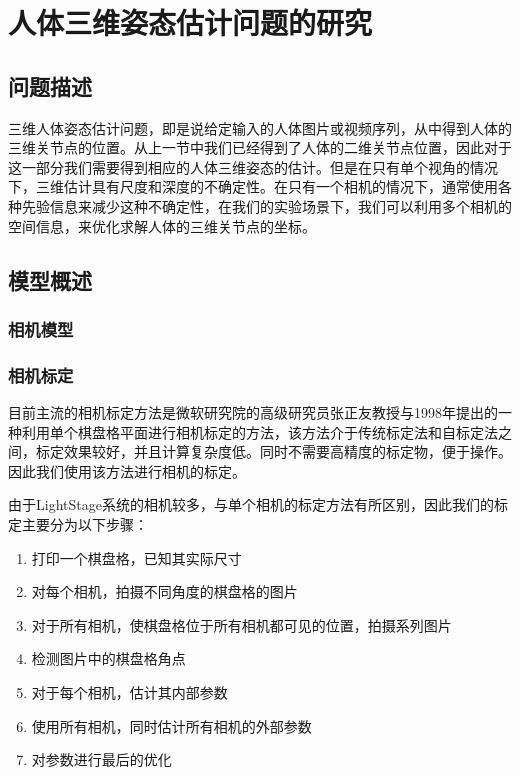 

\section{人体三维姿态估计问题的研究}
\subsection{问题描述}
三维人体姿态估计问题，即是说给定输入的人体图片或视频序列，从中得到人体的三维关节点的位置。从上一节中我们已经得到了人体的二维关节点位置，因此对于这一部分我们需要得到相应的人体三维姿态的估计。但是在只有单个视角的情况下，三维估计具有尺度和深度的不确定性。在只有一个相机的情况下，通常使用各种先验信息来减少这种不确定性，在我们的实验场景下，我们可以利用多个相机的空间信息，来优化求解人体的三维关节点的坐标。

\subsection{模型概述}
\subsubsection{相机模型}

\subsubsection{相机标定}
目前主流的相机标定方法是微软研究院的高级研究员张正友教授与1998年提出的一种利用单个棋盘格平面进行相机标定的方法，该方法介于传统标定法和自标定法之间，标定效果较好，并且计算复杂度低。同时不需要高精度的标定物，便于操作。因此我们使用该方法进行相机的标定。

由于LightStage系统的相机较多，与单个相机的标定方法有所区别，因此我们的标定主要分为以下步骤：
\begin{enumerate}
    \item 打印一个棋盘格，已知其实际尺寸
    \item 对每个相机，拍摄不同角度的棋盘格的图片
    \item 对于所有相机，使棋盘格位于所有相机都可见的位置，拍摄系列图片
    \item 检测图片中的棋盘格角点
    \item 对于每个相机，估计其内部参数
    \item 使用所有相机，同时估计所有相机的外部参数
    \item 对参数进行最后的优化
\end{enumerate}

